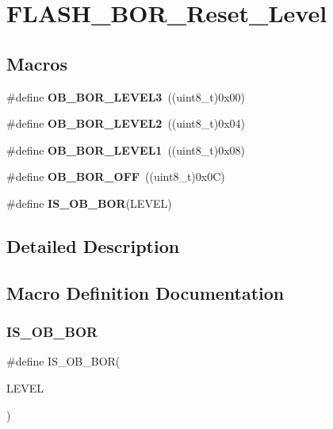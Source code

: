 \section{F\+L\+A\+S\+H\+\_\+\+B\+O\+R\+\_\+\+Reset\+\_\+\+Level}
\label{group__FLASH__BOR__Reset__Level}
\subsection*{Macros}
\begin{DoxyCompactItemize}
\item 
\#define \textbf{ O\+B\+\_\+\+B\+O\+R\+\_\+\+L\+E\+V\+E\+L3}~((uint8\+\_\+t)0x00)
\item 
\#define \textbf{ O\+B\+\_\+\+B\+O\+R\+\_\+\+L\+E\+V\+E\+L2}~((uint8\+\_\+t)0x04)
\item 
\#define \textbf{ O\+B\+\_\+\+B\+O\+R\+\_\+\+L\+E\+V\+E\+L1}~((uint8\+\_\+t)0x08)
\item 
\#define \textbf{ O\+B\+\_\+\+B\+O\+R\+\_\+\+O\+FF}~((uint8\+\_\+t)0x0\+C)
\item 
\#define \textbf{ I\+S\+\_\+\+O\+B\+\_\+\+B\+OR}(L\+E\+V\+EL)
\end{DoxyCompactItemize}


\subsection{Detailed Description}


\subsection{Macro Definition Documentation}
\mbox{\label{group__FLASH__BOR__Reset__Level_ga1fbf304e1564edd30259c5ea069afc93}} 
\subsubsection{I\+S\+\_\+\+O\+B\+\_\+\+B\+OR}
{\footnotesize\ttfamily \#define I\+S\+\_\+\+O\+B\+\_\+\+B\+OR(\begin{DoxyParamCaption}\item[{}]{L\+E\+V\+EL }\end{DoxyParamCaption})}

